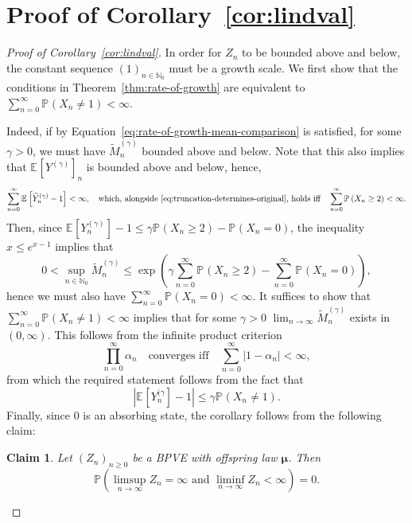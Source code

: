 \documentclass[12pt]{article}
\newtheorem{clm}{Claim}[thm]
\theoremstyle{definition}
\newcommand{\E}[2][]{\ensuremath{\mathbb{E}_{#1}\left[#2 \right]}}
\newcommand{\Prob}[2][]{\ensuremath{\mathbb{P}_{#1} \left(#2 \right)}}
\begin{document}
\section{Proof of Corollary~\ref{cor:lindval}} \label{sec:cor}
\begin{proof}[Proof of Corollary~\ref{cor:lindval}]
In order for $Z_{n}$ to be bounded above and below, the constant sequence $(1)_{n \in \mathbb{N}_0}$ must be a growth scale. We first show that the conditions in Theorem~\ref{thm:rate-of-growth} are equivalent to $\sum_{n=0}^{\infty} \Prob{X_{n} \neq 1} < \infty$. 

Indeed, if by Equation~\eqref{eq:rate-of-growth-mean-comparison} is satisfied, for some $\gamma > 0$, we must have $\tilde{M}^{(\gamma)}_{n}$ bounded above and below. Note that this also implies that $\E{Y^{(\gamma)}}_{n}$ is bounded above and below, hence, 
\[
 \sum_{n=0}^{\infty} \E{\widehat{Y}^{(\gamma)}_{n} - 1} < \infty, \quad \text{which, alongside~\eqref{eq:truncation-determines-original}, holds iff} \quad \sum_{n=0}^{\infty} \Prob{X_{n} \geq 2} < \infty. 
\]
Then, since $\E{Y^{(\gamma)}_{n}} - 1 \leq \gamma \Prob{X_{n} \geq 2} - \Prob{X_{n}=0}$, the inequality $x \leq e^{x-1}$ implies that
\begin{equation} \label{eq:one-side-tail}
0 < \sup_{n \in \mathbb{N}_0}\tilde{M}^{(\gamma)}_{n} \leq \exp\left(\gamma \sum_{n=0}^{\infty}\Prob{X_{n} \geq 2} - \sum_{n=0}^{\infty} \Prob{X_{n} = 0}\right),
\end{equation}
hence we must also have $\sum_{n=0}^{\infty} \Prob{X_{n} = 0} < \infty$. It suffices to show that $\sum_{n=0}^{\infty} \Prob{X_{n} \neq 1} < \infty$ implies that for some $\gamma > 0$ $\lim_{n \to \infty} \tilde{M}^{(\gamma)}_{n}$ exists in $(0, \infty)$. This follows from the infinite product criterion
\[
\prod_{n=0}^{\infty} \alpha_{n} \quad \text{converges iff} \quad \sum_{n=0}^{\infty} \left|1 - \alpha_n\right| < \infty, 
\]
from which the required statement follows from the fact that 
\[
\left|\E{Y^{(\gamma}_{n}} - 1 \right| \leq \gamma \Prob{X_{n} \neq 1}. 
\]
Finally, since $0$ is an absorbing state, the corollary follows from the following claim:
\begin{clm} \label{clm:last}
Let $(Z_n)_{n\geq 0}$ be a BPVE with offspring law $\boldsymbol{\mu}$. Then
\[
    \mathbb P\left(
        \limsup_{n\to\infty} Z_n = \infty
        \text{ and }
        \liminf_{n\to\infty} Z_n < \infty
    \right)=0.
\]
\end{clm}
\end{proof}
\end{document}
